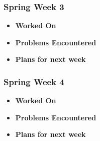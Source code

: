 \documentclass[compsoc,draftclsnofoot,onecolumn,10pt]{IEEEtran}
\begin{document}
\subsubsection{Spring Week 3}
\begin{itemize}
    \item {\textbf{Worked On}}
    \begin{itemize}

    \end{itemize}

    \item {\textbf{Problems Encountered}}
    \begin{itemize}

    \end{itemize}

    \item{\textbf{Plans for next week}}
    \begin{itemize}

    \end{itemize}

\end{itemize}

\subsubsection{Spring Week 4}
\begin{itemize}
    \item {\textbf{Worked On}}
    \begin{itemize}

    \end{itemize}

    \item {\textbf{Problems Encountered}}
    \begin{itemize}

    \end{itemize}

    \item{\textbf{Plans for next week}}
    \begin{itemize}

    \end{itemize}

\end{itemize}
\end{document}
